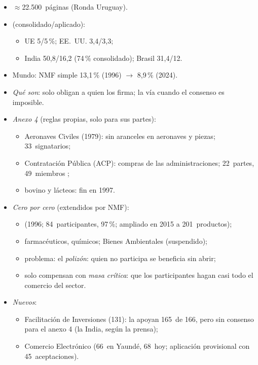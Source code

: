 \documentclass{article}
\begin{document}
\begin{columnas}
\begin{itemize}
\item $\approx$22.500~páginas (Ronda Uruguay).
\item {} (consolidado/aplicado):
  \begin{itemize}
  \item UE 5/5\,\%; EE.~UU. 3,4/3,3;
  \item India 50,8/16,2 (74\,\% consolidado); Brasil 31,4/12.
  \end{itemize}
\item Mundo: NMF simple 13,1\,\% (1996) $\to$ 8,9\,\% (2024).
\end{itemize}

\begin{itemize}
\item \emph{Qué son}: solo obligan a quien los firma; la vía cuando el consenso es imposible.
\item \emph{Anexo 4} (reglas propias, solo para sus partes):
  \begin{itemize}
  \item Aeronaves Civiles (1979): sin aranceles en aeronaves y piezas; 33~signatarios;
  \item Contratación Pública (ACP): compras de las administraciones; 22~partes, 49~miembros ;
  \item bovino y lácteos: fin en 1997.
  \end{itemize}
\item \emph{Cero por cero} (extendidos por NMF):
  \begin{itemize}
  \item {} (1996; 84~participantes, 97\,\%; ampliado en 2015 a 201~productos);
  \item farmacéuticos, químicos; Bienes Ambientales (suspendido);
  \item problema: el \emph{polizón}: quien no participa se beneficia sin abrir;
  \item solo compensan con \emph{masa crítica}: que los participantes hagan casi todo el comercio del sector.
  \end{itemize}
\item \emph{Nuevos}:
  \begin{itemize}
  \item Facilitación de Inversiones (131): la apoyan 165~de 166, pero sin consenso para el anexo 4 (la India, según la prensa);
  \item Comercio Electrónico (66~en Yaundé, 68~hoy; aplicación provisional con 45~aceptaciones).
  \end{itemize}
\end{itemize}


\end{columnas}
\end{document}

